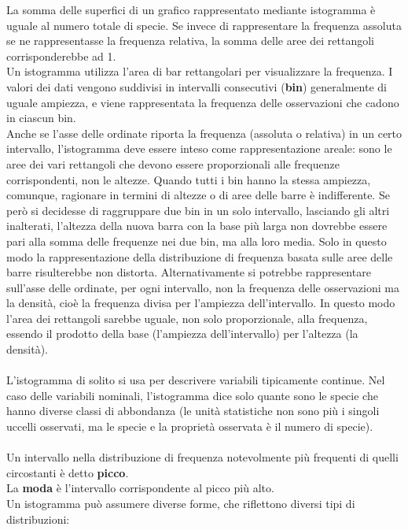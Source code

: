 \documentclass[10pt, draft]{book}
\begin{document}
La somma delle superfici di un grafico rappresentato mediante istogramma è uguale al numero totale di specie. Se invece di rappresentare la frequenza assoluta se ne rappresentasse la frequenza relativa, la somma delle aree dei rettangoli corrisponderebbe ad 1.
\\
Un istogramma utilizza l'area di bar rettangolari per visualizzare la frequenza. I valori dei dati vengono suddivisi in intervalli consecutivi (\textbf{bin}) generalmente di uguale ampiezza, e viene rappresentata la frequenza delle osservazioni che cadono in ciascun bin. 
\\
Anche se l'asse delle ordinate riporta la frequenza (assoluta o relativa) in un certo intervallo, l'istogramma deve essere inteso come rappresentazione areale: sono le aree dei vari rettangoli che devono essere proporzionali alle frequenze corrispondenti, non le altezze. Quando tutti i bin hanno la stessa ampiezza, comunque, ragionare in termini di altezze o di aree delle barre è indifferente. Se però si decidesse di raggruppare due bin in un solo intervallo, lasciando gli altri inalterati, l'altezza della nuova barra con la base più larga non dovrebbe essere pari alla somma delle frequenze nei due bin, ma alla loro media. Solo in questo modo la rappresentazione della distribuzione di frequenza basata sulle aree delle barre risulterebbe non distorta. Alternativamente si potrebbe rappresentare sull'asse delle ordinate, per ogni intervallo, non la frequenza delle osservazioni ma la densità, cioè la frequenza divisa per l'ampiezza dell'intervallo. In questo modo l'area dei rettangoli sarebbe uguale, non solo proporzionale, alla frequenza, essendo il prodotto della base (l'ampiezza dell'intervallo) per l'altezza (la densità).
\\
\\
L'istogramma di solito si usa per descrivere variabili tipicamente continue. Nel caso delle variabili nominali, l'istogramma dice solo quante sono le specie che hanno diverse classi di abbondanza (le unità statistiche non sono più i singoli uccelli osservati, ma le specie e la proprietà osservata è il numero di specie).
\\
\\
Un intervallo nella distribuzione di frequenza notevolmente più frequenti di quelli circostanti è detto \textbf{picco}.
\\
La \textbf{moda} è l'intervallo corrispondente al picco più alto.
\\
Un istogramma può assumere diverse forme, che riflettono diversi tipi di distribuzioni:
\end{document}
